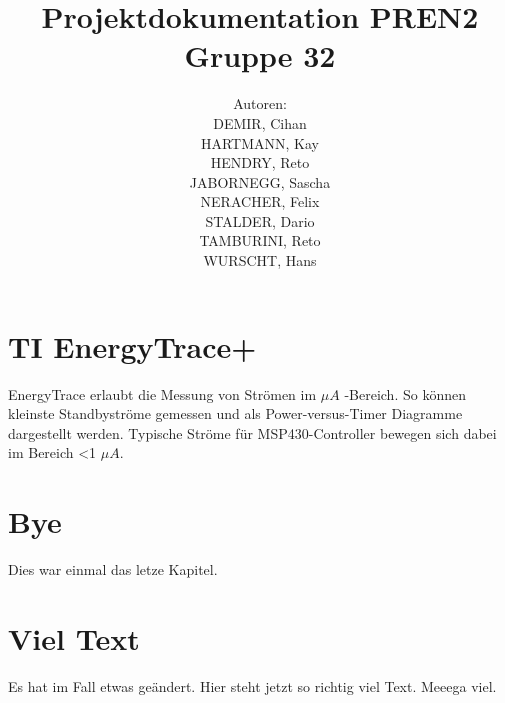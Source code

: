 \documentclass[11pt,german]{article}
\author{	Autoren:\\
			DEMIR, Cihan\\
			HARTMANN, Kay\\
			HENDRY, Reto\\
			JABORNEGG, Sascha\\
			NERACHER, Felix\\			
			STALDER, Dario\\
			TAMBURINI, Reto\\
			WURSCHT, Hans
		}
\title{Projektdokumentation PREN2\\Gruppe 32}
\begin{document}
  \maketitle
  \tableofcontents
	\newpage	
  \section{TI EnergyTrace+}
  EnergyTrace erlaubt die Messung von Strömen im $\mu A$ -Bereich. So können kleinste Standbyströme gemessen und als Power-versus-Timer Diagramme dargestellt werden. Typische Ströme für MSP430-Controller bewegen sich dabei im Bereich \textless 1 $\mu A$.

  \section{Bye}
  Dies war einmal das letze Kapitel.
  \section{Viel Text}
  Es hat im Fall etwas geändert.
  Hier steht jetzt so richtig viel Text.
  Meeega viel.
\end{document}

